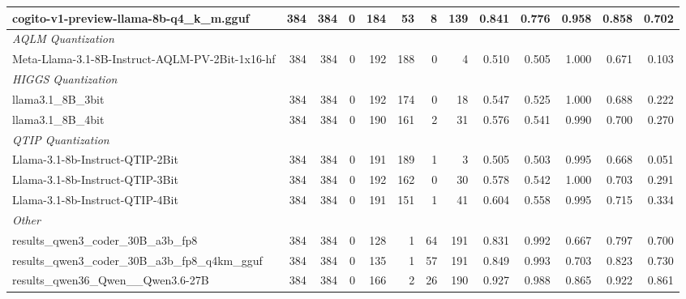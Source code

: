 \begin{table}[htbp]
{\begin{tabular}{lrrrrrrrrrrrr}
    cogito-v1-preview-llama-8b-q4\_k\_m.gguf & 384 & 384 & 0 & 184 & 53 & 8 & 139 & 0.841 & 0.776 & 0.958 & 0.858 & 0.702 \\
    \midrule
    \multicolumn{13}{l}{\textit{AQLM Quantization}} \\
    \midrule
    Meta-Llama-3.1-8B-Instruct-AQLM-PV-2Bit-1x16-hf & 384 & 384 & 0 & 192 & 188 & 0 & 4 & 0.510 & 0.505 & 1.000 & 0.671 & 0.103 \\
    \midrule
    \multicolumn{13}{l}{\textit{HIGGS Quantization}} \\
    \midrule
    llama3.1\_8B\_3bit & 384 & 384 & 0 & 192 & 174 & 0 & 18 & 0.547 & 0.525 & 1.000 & 0.688 & 0.222 \\
    llama3.1\_8B\_4bit & 384 & 384 & 0 & 190 & 161 & 2 & 31 & 0.576 & 0.541 & 0.990 & 0.700 & 0.270 \\
    \midrule
    \multicolumn{13}{l}{\textit{QTIP Quantization}} \\
    \midrule
    Llama-3.1-8b-Instruct-QTIP-2Bit & 384 & 384 & 0 & 191 & 189 & 1 & 3 & 0.505 & 0.503 & 0.995 & 0.668 & 0.051 \\
    Llama-3.1-8b-Instruct-QTIP-3Bit & 384 & 384 & 0 & 192 & 162 & 0 & 30 & 0.578 & 0.542 & 1.000 & 0.703 & 0.291 \\
    Llama-3.1-8b-Instruct-QTIP-4Bit & 384 & 384 & 0 & 191 & 151 & 1 & 41 & 0.604 & 0.558 & 0.995 & 0.715 & 0.334 \\
    \midrule
    \multicolumn{13}{l}{\textit{Other}} \\
    \midrule
    results\_qwen3\_coder\_30B\_a3b\_fp8 & 384 & 384 & 0 & 128 & 1 & 64 & 191 & 0.831 & 0.992 & 0.667 & 0.797 & 0.700 \\
    results\_qwen3\_coder\_30B\_a3b\_fp8\_q4km\_gguf & 384 & 384 & 0 & 135 & 1 & 57 & 191 & 0.849 & 0.993 & 0.703 & 0.823 & 0.730 \\
    results\_qwen36\_Qwen\_\_Qwen3.6-27B & 384 & 384 & 0 & 166 & 2 & 26 & 190 & 0.927 & 0.988 & 0.865 & 0.922 & 0.861 \\
    \bottomrule
  \end{tabular}
  }
\end{table}

